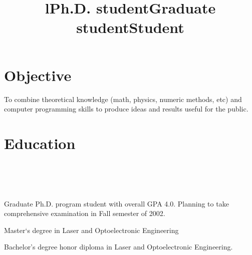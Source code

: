 \documentclass[10pt,overlapped,line]{res}
\begin{document}
\address{ 
  \textbf{Preferred Mailing Address:}\newline 
  Computer Science Dept., FEC \\ 
  UNM, Albuquerque NM, 87131 \\  
  USA \newline
}  
\address{
   \textbf{Current Address}: Ortiz SE.  Apt.13 \\
   Albuquerque NM, 87108 \\
   USA
}
\address{  
  \href{URL}{email:yoh@cs.unm.edu}\\ 
  \href{URL}{http://www.onerussian.com}\\
  \texttt{(505) 266-5958 (home)}
} 
 
\begin{resume}

\section{Objective} 
   To combine theoretical knowledge (math, physics, numeric methods, etc)
   and computer programming skills to produce ideas and results useful
   for the public.
   
\section{Education}
\begin{format}
  \title{l}\\
  \\
  \body\\
\end{format}

\title{Ph.D. student}
\begin{position}
  Graduate Ph.D. program student with overall GPA 4.0. Planning to
take comprehensive examination in Fall semester of 2002.
\end{position}

\title{Graduate student}
\begin{position}
 Master`s degree in Laser and Optoelectronic Engineering
\end{position}

\title{Student}
\begin{position}
 Bachelor's degree honor diploma in Laser and Optoelectronic Engineering.
\end{position}


\end{resume}
\end{document}
